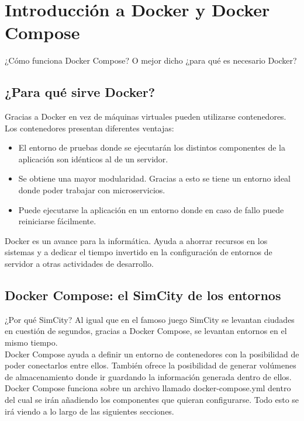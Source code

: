 \section{Introducción a Docker y Docker Compose}
¿Cómo funciona Docker Compose? O mejor dicho ¿para qué es necesario Docker?

\subsection{¿Para qué sirve Docker?}
Gracias a Docker en vez de máquinas virtuales pueden utilizarse contenedores. Los contenedores presentan diferentes ventajas:

\begin{itemize}
  \item El entorno de pruebas donde se ejecutarán los distintos componentes de la aplicación son idénticos al de un servidor.
  \item Se obtiene una mayor modularidad. Gracias a esto se tiene un entorno ideal donde poder trabajar con microservicios.
  \item Puede ejecutarse la aplicación en un entorno donde en caso de fallo puede reiniciarse fácilmente.
\end{itemize}

Docker es un avance para la informática. Ayuda a ahorrar recursos en los sistemas y a dedicar el tiempo invertido en la configuración de entornos de servidor a otras actividades de desarrollo.

\subsection{Docker Compose: el SimCity de los entornos}

¿Por qué SimCity? Al igual que en el famoso juego SimCity se levantan ciudades en cuestión de segundos, gracias a Docker Compose, se levantan entornos en el mismo tiempo.
\\Docker Compose ayuda a definir un entorno de contenedores con la posibilidad de poder conectarlos entre ellos. También ofrece la posibilidad de generar volúmenes de almacenamiento donde ir guardando la información generada dentro de ellos.
\\Docker Compose funciona sobre un archivo llamado docker-compose.yml dentro del cual se irán añadiendo los componentes que quieran configurarse. Todo esto se irá viendo a lo largo de las siguientes secciones.